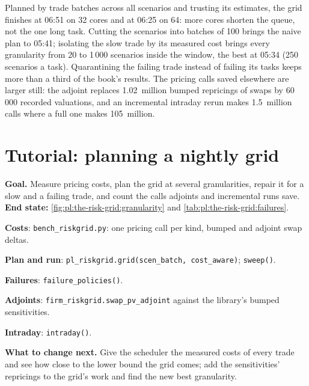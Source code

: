 \begin{example}[06:51 against 06:00]\label{ex:pl:the-risk-grid:batch}
Planned by trade batches across all scenarios and trusting its estimates, the grid finishes at 06:51 on 32 cores and at 06:25 on 64: more
cores shorten the queue, not the one long task. Cutting the scenarios into batches of 100 brings the naive plan to 05:41; isolating the slow
trade by its measured cost brings every granularity from 20 to 1\,000 scenarios inside the window, the best at 05:34 (250 scenarios a task).
Quarantining the failing trade instead of failing its tasks keeps more than a third of the book's results. The pricing calls saved elsewhere are larger
still: the adjoint replaces 1.02~million bumped repricings of swaps by 60\,000 recorded valuations, and an incremental intraday rerun makes
1.5~million calls where a full one makes 105~million.
\end{example}

\section{Tutorial: planning a nightly grid}\label{tut:pl:the-risk-grid:tut}

\begin{tutorial}
\textbf{Goal.} Measure pricing costs, plan the grid at several granularities, repair it for a slow and a failing trade, and count the calls
adjoints and incremental runs save. \textbf{End state:} \cref{fig:pl:the-risk-grid:granularity} and \cref{tab:pl:the-risk-grid:failures}.
\begin{tutsteps}
\item \textbf{Costs}: \texttt{bench\_riskgrid.py}: one pricing call per kind, bumped and adjoint swap deltas.
\item \textbf{Plan and run}: \texttt{pl\_riskgrid.grid(scen\_batch, cost\_aware)}; \texttt{sweep()}.
\item \textbf{Failures}: \texttt{failure\_policies()}.
\item \textbf{Adjoints}: \texttt{firm\_riskgrid.swap\_pv\_adjoint} against the library's bumped sensitivities.
\item \textbf{Intraday}: \texttt{intraday()}.
\end{tutsteps}
\textbf{What to change next.} Give the scheduler the measured costs of every trade and see how close to the lower bound the grid comes; add
the sensitivities' repricings to the grid's work and find the new best granularity.
\end{tutorial}


